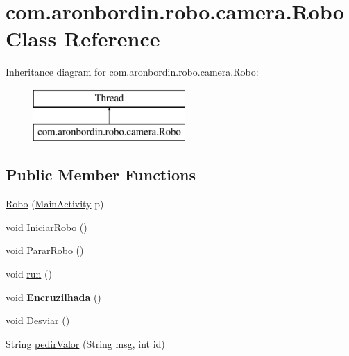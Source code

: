 \hypertarget{classcom_1_1aronbordin_1_1robo_1_1camera_1_1Robo}{\section{com.\+aronbordin.\+robo.\+camera.\+Robo Class Reference}
\label{classcom_1_1aronbordin_1_1robo_1_1camera_1_1Robo}
}
Inheritance diagram for com.\+aronbordin.\+robo.\+camera.\+Robo\+:\begin{figure}[H]
\begin{center}
\leavevmode
\includegraphics[height=2.000000cm]{df/d6a/classcom_1_1aronbordin_1_1robo_1_1camera_1_1Robo}
\end{center}
\end{figure}
\subsection*{Public Member Functions}
\begin{DoxyCompactItemize}
\item 
\hyperlink{classcom_1_1aronbordin_1_1robo_1_1camera_1_1Robo_a0480d3ff0c17c3acca728036f752c563}{Robo} (\hyperlink{classcom_1_1aronbordin_1_1robo_1_1camera_1_1MainActivity}{Main\+Activity} p)
\item 
void \hyperlink{classcom_1_1aronbordin_1_1robo_1_1camera_1_1Robo_a84b416945e3162ab1b1bb1dea5220339}{Iniciar\+Robo} ()
\item 
void \hyperlink{classcom_1_1aronbordin_1_1robo_1_1camera_1_1Robo_a7fbc061611f1fc6cdd362bedff8d2db4}{Parar\+Robo} ()
\item 
void \hyperlink{classcom_1_1aronbordin_1_1robo_1_1camera_1_1Robo_a04cd1e45ad45e03c773cc4e5ef7dbff7}{run} ()
\item 
\hypertarget{classcom_1_1aronbordin_1_1robo_1_1camera_1_1Robo_a1eeb38dd522233031de91b821e806264}{void {\bfseries Encruzilhada} ()}\label{classcom_1_1aronbordin_1_1robo_1_1camera_1_1Robo_a1eeb38dd522233031de91b821e806264}

\item 
void \hyperlink{classcom_1_1aronbordin_1_1robo_1_1camera_1_1Robo_af4c9ecee2838f22efd53f84b48e14c55}{Desviar} ()
\item 
String \hyperlink{classcom_1_1aronbordin_1_1robo_1_1camera_1_1Robo_af307e730541de825a3017353b06a8667}{pedir\+Valor} (String msg, int id)
\end{DoxyCompactItemize}
